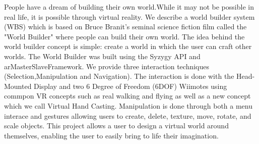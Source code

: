 People have a dream of building their own world.While it may not be possible in real life, it is possible through virtual reality.
We describe a world builder system (WBS) which is based on Bruce Branit's seminal science fiction film called the "World Builder" where people can build their own world.
The idea behind the world builder concept is simple: create a world in which the user can craft other worlds.
The World Builder was built using the Syzygy API and arMasterSlaveFramework.
We provide three interaction techniques (Selection,Manipulation and Navigation).
The interaction is done with the Head-Mounted Display and two 6 Degree of Freedom (6DOF) Wiimotes using commpon VR concepts such as real walking and flying as well as a new concept which we call Virtual Hand Casting.
Manipulation is done through both a menu interace and gestures allowing users to create, delete, texture, move, rotate, and scale objects.
This project allows a user to design a virtual world around themselves, enabling the user to easily bring to life their imagination.
